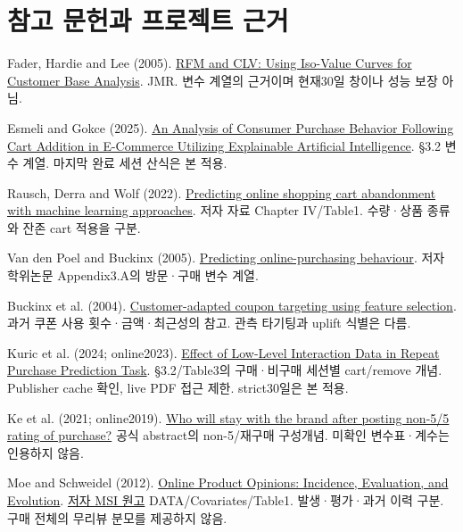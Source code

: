 \documentclass[11pt,a4paper]{article}
\begin{document}
\section*{참고 문헌과 프로젝트 근거}
{\small
\begin{description}[leftmargin=10mm,labelwidth=9mm,itemsep=6pt,font=\bfseries]
\item[R01] Fader, Hardie and Lee (2005). \href{https://faculty.wharton.upenn.edu/wp-content/uploads/2013/08/RFM_CLV-JMR-2005.pdf}{RFM and CLV: Using Iso-Value Curves for Customer Base Analysis}. JMR. 변수 계열의 근거이며 현재30일 창이나 성능 보장 아님.
\item[R04] Esmeli and Gokce (2025). \href{https://www.mdpi.com/0718-1876/20/1/28}{An Analysis of Consumer Purchase Behavior Following Cart Addition in E-Commerce Utilizing Explainable Artificial Intelligence}. §3.2 변수 계열. 마지막 완료 세션 산식은 본 적용.
\item[R06] Rausch, Derra and Wolf (2022). \href{https://epub.uni-bayreuth.de/id/eprint/5398/}{Predicting online shopping cart abandonment with machine learning approaches}. 저자 자료 Chapter IV/Table1. 수량·상품 종류와 잔존 cart 적용을 구분.
\item[R07] Van den Poel and Buckinx (2005). \href{https://backoffice.biblio.ugent.be/download/468198/1877085}{Predicting online-purchasing behaviour}. 저자 학위논문 Appendix3.A의 방문·구매 변수 계열.
\item[R08] Buckinx et al. (2004). \href{https://backoffice.biblio.ugent.be/download/468198/1877085}{Customer-adapted coupon targeting using feature selection}. 과거 쿠폰 사용 횟수·금액·최근성의 참고. 관측 타기팅과 uplift 식별은 다름.
\item[R15] Kuric et al. (2024; online2023). \href{https://doi.org/10.1080/10447318.2023.2175973}{Effect of Low-Level Interaction Data in Repeat Purchase Prediction Task}. §3.2/Table3의 구매·비구매 세션별 cart/remove 개념. Publisher cache 확인, live PDF 접근 제한. strict30일은 본 적용.
\item[R16] Ke et al. (2021; online2019). \href{https://link.springer.com/article/10.1007/s10257-019-00416-9}{Who will stay with the brand after posting non-5/5 rating of purchase?} 공식 abstract의 non-5/재구매 구성개념. 미확인 변수표·계수는 인용하지 않음.
\item[R17] Moe and Schweidel (2012). \href{https://pubsonline.informs.org/doi/10.1287/mksc.1110.0662}{Online Product Opinions: Incidence, Evaluation, and Evolution}. \href{https://thearf-org-unified-admin.s3.amazonaws.com/MSI/2020/06/MSI_SR_10-204.pdf}{저자 MSI 원고} DATA/Covariates/Table1. 발생·평가·과거 이력 구분. 구매 전체의 무리뷰 분모를 제공하지 않음.
\end{description}}
\end{document}
